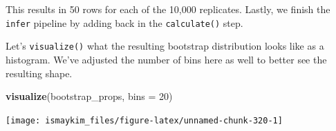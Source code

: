 \documentclass[12pt, krantz2,]{krantz}
\makeatletter
\newenvironment{Shaded}{\begin{snugshade}}{\end{snugshade}}
\newcommand{\DataTypeTok}[1]{\textcolor[rgb]{0.27,0.27,0.27}{#1}}
\newcommand{\DecValTok}[1]{\textcolor[rgb]{0.06,0.06,0.06}{#1}}
\newcommand{\KeywordTok}[1]{\textcolor[rgb]{0.27,0.27,0.27}{\textbf{#1}}}
\newcommand{\NormalTok}[1]{#1}
\newcommand{\OperatorTok}[1]{\textcolor[rgb]{0.43,0.43,0.43}{\textbf{#1}}}
\newcommand{\OtherTok}[1]{\textcolor[rgb]{0.37,0.37,0.37}{#1}}
\newcommand{\StringTok}[1]{\textcolor[rgb]{0.5,0.5,0.5}{#1}}
\newenvironment{kframe}{%
\medskip{}
\setlength{\fboxsep}{.8em}
 \def\at@end@of@kframe{}%
 \ifinner\ifhmode%
  \def\at@end@of@kframe{\end{minipage}}%
  \begin{minipage}{\columnwidth}%
 \fi\fi%
 \def\FrameCommand##1{\hskip\@totalleftmargin \hskip-\fboxsep
 \colorbox{shadecolor}{##1}\hskip-\fboxsep
     \hskip-\linewidth \hskip-\@totalleftmargin \hskip\columnwidth}%
 \MakeFramed {\advance\hsize-\width
   \@totalleftmargin\z@ \linewidth\hsize
   \@setminipage}}%
 {\par\unskip\endMakeFramed%
 \at@end@of@kframe}
\renewenvironment{Shaded}{\begin{kframe}}{\end{kframe}}
\makeatother
\begin{document}
\begin{Shaded}
\end{Shaded}

This results in 50 rows for each of the 10,000 replicates. Lastly, we finish the \texttt{infer} pipeline by adding back in the \texttt{calculate()} step.

\begin{Shaded}
\end{Shaded}

Let's \texttt{visualize()} what the resulting bootstrap distribution looks like as a histogram. We've adjusted the number of bins here as well to better see the resulting shape.

\begin{Shaded}
\begin{Highlighting}[]
\KeywordTok{visualize}\NormalTok{(bootstrap_props, }\DataTypeTok{bins =} \DecValTok{20}\NormalTok{)}
\end{Highlighting}
\end{Shaded}

\begin{center}\texttt{[image: ismaykim\_files/figure-latex/unnamed-chunk-320-1]} \end{center}
\end{document}
